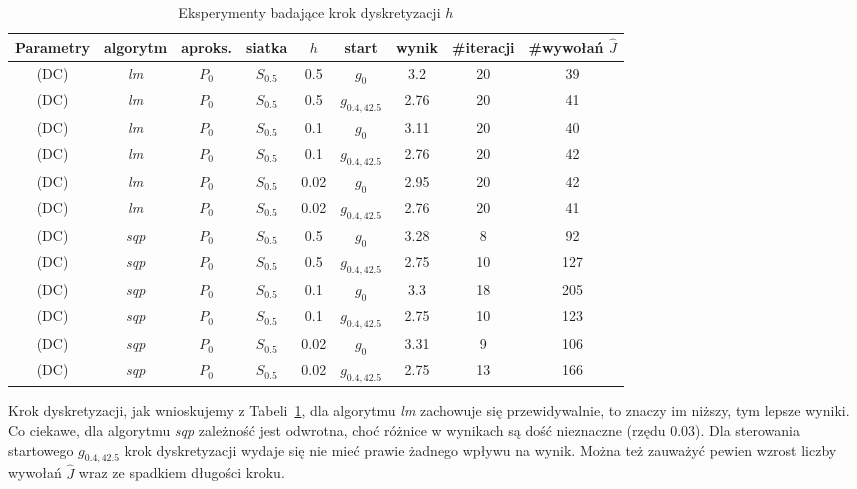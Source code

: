 \documentclass[11pt]{article}
\begin{document}
\begin{table}[h]
  \begin{center}
    \begin{tabular}{|c|c|c|c|c|c|c|c|c|}
      \hline
      Parametry & algorytm & aproks. & siatka & $h$ & start & wynik & \#iteracji & \#wywołań $\hat{J}$ \\
      \hline
      (DC) & {\it lm\/} & $P_0$ & $S_{0.5}$ & 0.5 & $g_0$ & 3.2 & 20 & 39 \\
      \hline
      (DC) & {\it lm\/} & $P_0$ & $S_{0.5}$ & 0.5 & $g_{0.4,42.5}$ & 2.76 & 20 & 41 \\
      \hline
      (DC) & {\it lm\/} & $P_0$ & $S_{0.5}$ & 0.1 & $g_0$ & 3.11 & 20 & 40 \\
      \hline
      (DC) & {\it lm\/} & $P_0$ & $S_{0.5}$ & 0.1 & $g_{0.4,42.5}$ & 2.76 & 20 & 42 \\
      \hline
      (DC) & {\it lm\/} & $P_0$ & $S_{0.5}$ & 0.02 & $g_0$ & 2.95 & 20 & 42 \\
      \hline
      (DC) & {\it lm\/} & $P_0$ & $S_{0.5}$ & 0.02 & $g_{0.4,42.5}$ & 2.76 & 20 & 41 \\
      \hline
      (DC) & {\it sqp\/} & $P_0$ & $S_{0.5}$ & 0.5 & $g_0$ & 3.28 & 8 & 92 \\
      \hline
      (DC) & {\it sqp\/} & $P_0$ & $S_{0.5}$ & 0.5 & $g_{0.4,42.5}$ & 2.75 & 10 & 127 \\
      \hline
      (DC) & {\it sqp\/} & $P_0$ & $S_{0.5}$ & 0.1 & $g_0$ & 3.3 & 18 & 205 \\
      \hline
      (DC) & {\it sqp\/} & $P_0$ & $S_{0.5}$ & 0.1 & $g_{0.4,42.5}$ & 2.75 & 10 & 123 \\
      \hline
      (DC) & {\it sqp\/} & $P_0$ & $S_{0.5}$ & 0.02 & $g_0$ & 3.31 & 9 & 106 \\
      \hline
      (DC) & {\it sqp\/} & $P_0$ & $S_{0.5}$ & 0.02 & $g_{0.4,42.5}$ & 2.75 & 13 & 166 \\
      \hline
    \end{tabular}    
    \caption{Eksperymenty badające krok dyskretyzacji $h$}\label{step_tbl}
  \end{center}
\end{table}

Krok dyskretyzacji, jak wnioskujemy z Tabeli~\ref{step_tbl}, dla algorytmu {\it lm\/} zachowuje się przewidywalnie, to znaczy im niższy, tym lepsze wyniki. Co ciekawe, dla algorytmu {\it sqp\/} zależność jest odwrotna, choć różnice w wynikach są dość nieznaczne (rzędu $0.03$). Dla sterowania startowego $g_{0.4,42.5}$ krok dyskretyzacji wydaje się nie mieć prawie żadnego wpływu na wynik. Można też zauważyć pewien wzrost liczby wywołań $\hat{J}$ wraz ze spadkiem długości kroku.
\end{document}
